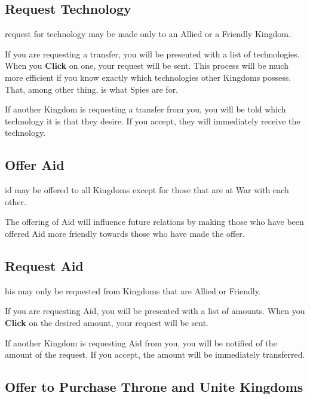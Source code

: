 \subsection{Request Technology}


 request for technology may be made only to an Allied or a Friendly Kingdom.

If you are requesting a transfer, you will be presented with a list of technologies. When you \textbf{Click} on one, your request will be sent. This process will be much more efficient if you know exactly which technologies other Kingdoms possess. That, among other thing, is what Spies are for.

If another Kingdom is requesting a transfer from you, you will be told which technology it is that they desire. If you accept, they will immediately receive the technology.

\subsection{Offer Aid}

id may be offered to all Kingdoms except for those that are at War with each other.

The offering  of Aid will influence future relations by making those who have been offered Aid more friendly towards those who have made the offer.

\subsection{Request Aid}


his may only be requested from Kingdoms that are Allied or Friendly.

If you are requesting Aid, you will be presented with a list of amounts. When you \textbf{Click} on the desired amount, your request will be sent.

If another Kingdom is requesting Aid from you, you will be notified of the amount of the request. If you accept, the amount will be immediately transferred.

\subsection{Offer to Purchase Throne and Unite Kingdoms}

